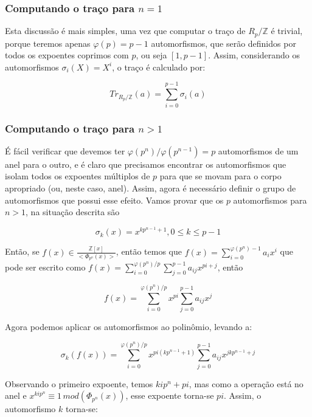 \subsubsection{Computando o traço para $n=1$}
Esta discussão é mais simples, uma vez que computar o traço de $R_{p}/\mathbb{Z}$ é trivial, porque teremos apenas $\varphi(p) = p-1$
automorfismos, que serão definidos por todos os expoentes coprimos com $p$, ou seja $[1,p-1]$. Assim, considerando os automorfismos $\sigma_i(X) = X^i$,
o traço é calculado por:

\begin{equation}
    Tr_{R_{p}/\mathbb{Z}} (a) = \sum_{i=0}^{p-1} \sigma_i(a)
    \label{eq:trace_result_m1}
\end{equation}

\subsubsection{Computando o traço para $n>1$}
É fácil verificar que devemos ter $\varphi(p^n)/\varphi(p^{n-1}) = p$ automorfismos de um anel para o outro, e é claro que precisamos encontrar os automorfismos
que isolam todos os expoentes múltiplos de $p$ para que se movam para o corpo apropriado (ou, neste caso, anel). Assim,
agora é necessário definir o grupo de automorfismos que possui esse efeito. Vamos provar que os $p$ automorfismos para $n>1$, na
situação descrita são

\begin{equation}
    \sigma_k(x) = x^{k p^{n-1} + 1}, 0 \leq k \leq p-1
    \label{def_aut}
\end{equation}

Então, se $f(x) \in \frac{\mathbb{Z}[x]}{<\Phi_{p^n}(x)>}$, então temos que $f(x) = \sum_{i=0}^{\varphi(p^n)-1} a_i x^i$ que pode ser escrito como $f(x) = \sum_{i=0}^{\varphi(p^n)/p} 
\sum_{j=0}^{p-1} a_{ij} x^{pi + j}$, então

\begin{equation}
    f(x) = \sum_{i=0}^{\varphi(p^n)/p} x^{pi} \sum_{j=0}^{p-1} a_{ij} x^{j}
\end{equation}

Agora podemos aplicar os automorfismos ao polinômio, levando a:

\begin{equation}
    \sigma_k(f(x)) = \sum_{i=0}^{\varphi(p^n)/p} x^{pi(k p^{n-1} + 1)} \sum_{j=0}^{p-1} a_{ij} x^{j k p^{n-1} + j}
\end{equation}

Observando o primeiro expoente, temos $kip^n + pi$, mas como a operação está no anel e $x^{kip^n} \equiv 1 \, mod (\Phi_{p^n}(x))$, esse expoente torna-se $pi$. Assim, o automorfismo $k$ torna-se:

